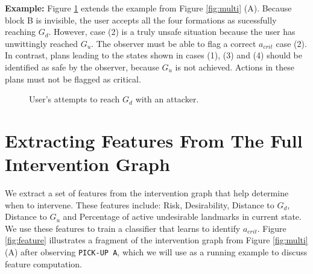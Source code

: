 \documentclass[letterpaper]{article}
\theoremstyle{plain}
\begin{document}
\textbf{Example:} Figure \ref{fig:fails} extends the example from Figure \ref{fig:multi} (A). Because block B is invisible, the user accepts all the four formations as sucessfully reaching $G_d$. However, case (2) is a truly unsafe situation because the user has unwittingly reached $G_u$. The observer must be able to flag a correct $a_{crit}$ case (2). In contrast, plans leading to the states shown in cases (1), (3) and (4) should be identified as safe by the observer, because $G_u$ is not achieved. Actions in these plans must not be flagged as critical.
\begin{figure}[ht]
\vspace{-3mm}        
        \caption{User's attempts to reach $G_d$ with an attacker.}
        \label{fig:fails}
\vspace{-5mm}        
\end{figure}


\section{Extracting Features From The Full Intervention Graph}
We extract a set of features from the intervention graph that help determine when to intervene. These features include: Risk, Desirability, Distance to $G_d$, Distance to $G_u$ and Percentage of active undesirable landmarks in current state. We use these features to train a classifier that learns to identify $a_{crit}$. Figure \ref{fig:feature} illustrates a fragment of the intervention graph from Figure \ref{fig:multi} (A) after observing \texttt{PICK-UP A}, which we will use as a running example to discuss feature computation.
\end{document}
